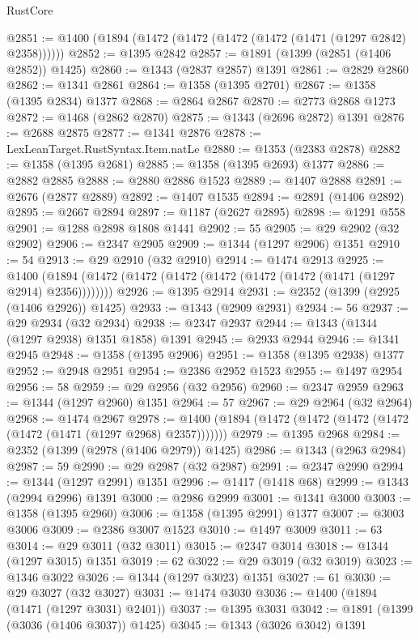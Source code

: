 \begin{lexlean}{RustCore}
\begin{coremodule}
@2851 := @1400 (@1894 (@1472 (@1472 (@1472 (@1472 (@1471 (@1297 @2842) @2358))))))
@2852 := @1395 @2842
@2857 := @1891 (@1399 (@2851 (@1406 @2852)) @1425)
@2860 := @1343 (@2837 @2857) @1391
@2861 := @2829 @2860
@2862 := @1341 @2861
@2864 := @1358 (@1395 @2701)
@2867 := @1358 (@1395 @2834) @1377
@2868 := @2864 @2867
@2870 := @2773 @2868 @1273
@2872 := @1468 (@2862 @2870)
@2875 := @1343 (@2696 @2872) @1391
@2876 := @2688 @2875
@2877 := @1341 @2876
@2878 := LexLeanTarget.RustSyntax.Item.natLe
@2880 := @1353 (@2383 @2878)
@2882 := @1358 (@1395 @2681)
@2885 := @1358 (@1395 @2693) @1377
@2886 := @2882 @2885
@2888 := @2880 @2886 @1523
@2889 := @1407 @2888
@2891 := @2676 (@2877 @2889)
@2892 := @1407 @1535
@2894 := @2891 (@1406 @2892)
@2895 := @2667 @2894
@2897 := @1187 (@2627 @2895)
@2898 := @1291 @558
@2901 := @1288 @2898 @1808 @1441
@2902 := 55
@2905 := @29 @2902 (@32 @2902)
@2906 := @2347 @2905
@2909 := @1344 (@1297 @2906) @1351
@2910 := 54
@2913 := @29 @2910 (@32 @2910)
@2914 := @1474 @2913
@2925 := @1400 (@1894 (@1472 (@1472 (@1472 (@1472 (@1472 (@1472 (@1471 (@1297 @2914) @2356))))))))
@2926 := @1395 @2914
@2931 := @2352 (@1399 (@2925 (@1406 @2926)) @1425)
@2933 := @1343 (@2909 @2931)
@2934 := 56
@2937 := @29 @2934 (@32 @2934)
@2938 := @2347 @2937
@2944 := @1343 (@1344 (@1297 @2938) @1351 @1858) @1391
@2945 := @2933 @2944
@2946 := @1341 @2945
@2948 := @1358 (@1395 @2906)
@2951 := @1358 (@1395 @2938) @1377
@2952 := @2948 @2951
@2954 := @2386 @2952 @1523
@2955 := @1497 @2954
@2956 := 58
@2959 := @29 @2956 (@32 @2956)
@2960 := @2347 @2959
@2963 := @1344 (@1297 @2960) @1351
@2964 := 57
@2967 := @29 @2964 (@32 @2964)
@2968 := @1474 @2967
@2978 := @1400 (@1894 (@1472 (@1472 (@1472 (@1472 (@1472 (@1471 (@1297 @2968) @2357)))))))
@2979 := @1395 @2968
@2984 := @2352 (@1399 (@2978 (@1406 @2979)) @1425)
@2986 := @1343 (@2963 @2984)
@2987 := 59
@2990 := @29 @2987 (@32 @2987)
@2991 := @2347 @2990
@2994 := @1344 (@1297 @2991) @1351
@2996 := @1417 (@1418 @68)
@2999 := @1343 (@2994 @2996) @1391
@3000 := @2986 @2999
@3001 := @1341 @3000
@3003 := @1358 (@1395 @2960)
@3006 := @1358 (@1395 @2991) @1377
@3007 := @3003 @3006
@3009 := @2386 @3007 @1523
@3010 := @1497 @3009
@3011 := 63
@3014 := @29 @3011 (@32 @3011)
@3015 := @2347 @3014
@3018 := @1344 (@1297 @3015) @1351
@3019 := 62
@3022 := @29 @3019 (@32 @3019)
@3023 := @1346 @3022
@3026 := @1344 (@1297 @3023) @1351
@3027 := 61
@3030 := @29 @3027 (@32 @3027)
@3031 := @1474 @3030
@3036 := @1400 (@1894 (@1471 (@1297 @3031) @2401))
@3037 := @1395 @3031
@3042 := @1891 (@1399 (@3036 (@1406 @3037)) @1425)
@3045 := @1343 (@3026 @3042) @1391

\end{coremodule}
\end{lexlean}
